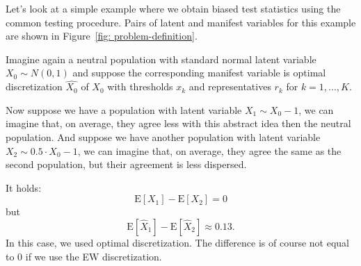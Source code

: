 \documentclass[10pt]{article}
\begin{document}
Let's look at a simple example where we obtain biased test statistics using the common testing procedure. Pairs of latent and manifest variables for this example are shown in Figure~\ref{fig: problem-definition}.

Imagine again a neutral population with standard normal latent variable $X_{0} \sim N(0,1)$ and suppose the corresponding manifest variable is optimal discretization $\hat{X_{0}}$ of $X_{0}$ with thresholds $x_{k}$ and representatives $r_{k}$ for $k = 1, ..., K$.

Now suppose we have a population with latent variable $X_{1} \sim X_{0} - 1$, we can imagine that, on average, they agree less with this abstract idea then the neutral population. And suppose we have another population with latent variable $X_{2} \sim 0.5 \cdot X_{0} - 1$, we can imagine that, on average, they agree the same as the second population, but their agreement is less dispersed.

It holds:
\begin{equation}
\mathrm{E}[X_{1}] - \mathrm{E}[X_{2}] = 0
\end{equation}
but
\begin{equation}
\mathrm{E}[\hat{X}_{1}] - \mathrm{E}[\hat{X}_{2}] \approx 0.13.
\end{equation}
In this case, we used optimal discretization. The difference is of course not equal to 0 if we use the EW discretization.
\end{document}
